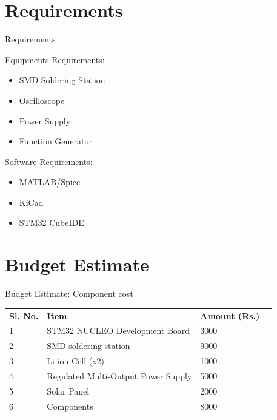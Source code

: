 \documentclass[aspectratio=169]{beamer}
\begin{document}
\section{Requirements}
\begin{frame}{Requirements}
	\begin{minipage}{0.5\textwidth}
		Equipments Requirements:
		\begin{itemize}
			
			\item SMD Soldering Station
			\item Oscilloscope
			\item Power Supply
			\item Function Generator
		\end{itemize} 
	\end{minipage}
	\begin{minipage}{0.3\textwidth}
		Software Requirements:
		\begin{itemize}
			
			\item MATLAB/Spice
			\item KiCad
			\item STM32 CubeIDE
			
		\end{itemize} 
		
	\end{minipage}
\end{frame}



\section{Budget Estimate}
\begin{frame}{Budget Estimate: Component cost}

\begin{table}[]
	\begin{tabular}{|l|l|l|l}
		\cline{1-3}
		\textbf{Sl. No.} & \textbf{Item}                       & \textbf{Amount (Rs.)} &  \\ \cline{1-3}
		1                & STM32 NUCLEO Development Board      & 3000                  &  \\ \cline{1-3}
		2                & SMD soldering station               & 9000                  &  \\ \cline{1-3}
		3                & Li-ion Cell (x2)                  & 1000                  &  \\ \cline{1-3}
		4                & Regulated Multi-Output Power Supply & 5000                  &  \\ \cline{1-3}
		5                & Solar Panel                         & 2000                    &  \\ \cline{1-3}
		6                & Components                          & 8000         &  \\ \cline{1-3}
	\end{tabular}
\end{table}

		

\end{frame}
\end{document}

